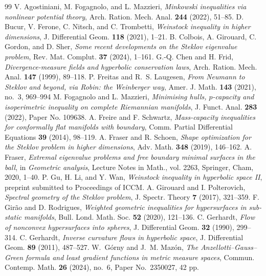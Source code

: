 \documentclass[10pt,a4paper]{amsart}
\numberwithin{equation}{section}
\begin{document}
\begin{thebibliography}{99}
 V. Agostiniani, M. Fogagnolo, and L. Mazzieri, \emph{Minkowski inequalities via nonlinear potential theory}, Arch. Ration. Mech. Anal. \textbf{244} (2022), 51--85.
 D. Bucur, V. Ferone, C. Nitsch, and C. Trombetti, \emph{Weinstock inequality in higher dimensions}, J. Differential Geom. \textbf{118} (2021), 1--21.
 B. Colbois, A. Girouard, C. Gordon, and D. Sher, \emph{Some recent developments on the Steklov eigenvalue problem}, Rev. Mat. Complut. \textbf{37} (2024), 1--161.
 G.-Q. Chen and H. Frid, \emph{Divergence-measure fields and hyperbolic conservation laws}, Arch. Ration. Mech. Anal. \textbf{147} (1999), 89--118.
 P. Freitas and R.~S. Laugesen, \emph{From Neumann to Steklov and beyond, via Robin: the Weinberger way}, Amer. J. Math. {\bf 143} (2021), no.~3, 969--994
 M. Fogagnolo and L. Mazzieri, \emph{Minimising hulls, $p$-capacity and isoperimetric inequality on complete Riemannian manifolds}, J. Funct. Anal. \textbf{283} (2022), Paper No. 109638.
 A. Freire and F. Schwartz, \emph{Mass-capacity inequalities for conformally flat manifolds with boundary}, Comm. Partial Differential Equations \textbf{39} (2014), 98--119.
 A. Fraser and R. Schoen, \emph{Shape optimization for the Steklov problem in higher dimensions}, Adv. Math. \textbf{348} (2019), 146--162.
 A. Fraser, \emph{Extremal eigenvalue problems and free boundary minimal surfaces in the ball}, in \emph{Geometric analysis}, Lecture Notes in Math., vol. 2263, Springer, Cham, 2020, 1--40.
 P. Gu, H. Li, and Y. Wan, \emph{Weinstock inequality in hyperbolic space II}, preprint submitted to Proceedings of ICCM.
 A. Girouard and I. Polterovich, \emph{Spectral geometry of the Steklov problem}, J. Spectr. Theory \textbf{7} (2017), 321--359.
 F. Gir\~ao and D. Rodrigues, \emph{Weighted geometric inequalities for hypersurfaces in sub-static manifolds}, Bull. Lond. Math. Soc. \textbf{52} (2020), 121--136.
 C. Gerhardt, \emph{Flow of nonconvex hypersurfaces into spheres}, J. Differential Geom. \textbf{32} (1990), 299--314.
 C. Gerhardt, \emph{Inverse curvature flows in hyperbolic space}, J. Differential Geom. \textbf{89} (2011), 487--527.
 W.~G{\'o}rny and J.~M. Maz{\'o}n, \emph{The Anzellotti--Gauss--Green formula and least gradient functions in metric measure spaces}, Commun. Contemp. Math. \textbf{26} (2024), no.~6, Paper No.~2350027, 42 pp.

\end{thebibliography}
\end{document}
